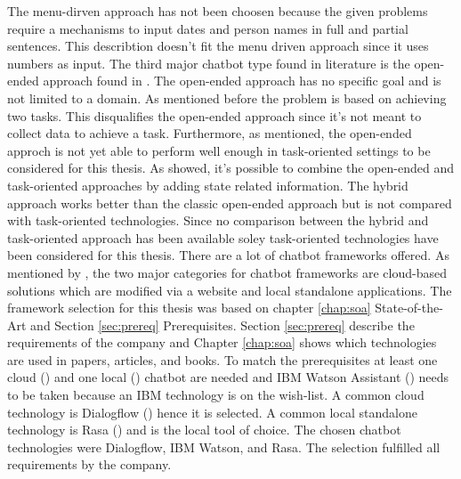 The menu-dirven approach has not been choosen because the given problems 
require a mechanisms to input dates and person names in full and partial sentences.
This describtion doesn't fit the menu driven approach since it uses numbers as input.
The third major chatbot type found in literature is the open-ended approach found in 
\citet{williams2017hybrid, bordes2016learning, rahman2017programming}.
The open-ended approach has no specific goal and is not limited to a domain.
As mentioned before the problem is based on achieving two tasks.
This disqualifies the open-ended approach since it's not meant to
collect data to achieve a task.
Furthermore, as \citet{bordes2016learning} mentioned, the open-ended approch is not 
yet able to perform well enough in task-oriented settings to be considered for this 
thesis.
As \citet{williams2017hybrid} showed, it's possible to combine the open-ended and 
task-oriented approaches by adding state related information.
The hybrid approach works better than the classic open-ended approach but 
is not compared with task-oriented technologies.
Since no comparison between the hybrid and task-oriented approach has been available 
soley task-oriented technologies have been considered for this thesis.
There are a lot of chatbot frameworks offered.
As mentioned by \citet{kane2016role}, the two major categories for chatbot frameworks 
are cloud-based solutions which are modified via a website and local standalone applications.
The framework selection for this thesis was based on chapter \ref{chap:soa} State-of-the-Art 
and Section \ref{sec:prereq} Prerequisites.
Section \ref{sec:prereq} describe the requirements of the company and Chapter \ref{chap:soa} shows which technologies are 
used in papers, articles, and books.
To match the prerequisites at least one cloud (\citet{braunEvaluatingNLU, rahman2017programming}) and one local (\citet{braunEvaluatingNLU}) chatbot are needed and IBM Watson Assistant (\citet{rahman2017programming, pharmacybot, ieee2018watson, gregori2017evaluation}) needs to be taken because an IBM technology is on the wish-list.
A common cloud technology is Dialogflow (\citet{braunEvaluatingNLU, dutta2017developing, singhbuilding, buiildChatbotsPython, rahman2017programming, ieee2018watson}) hence it is selected.
A common local standalone technology is Rasa (\citet{braunEvaluatingNLU, singhbuilding, rasabocklisch2017, buiildChatbotsPython, gregori2017evaluation}) and is the local tool of choice.
The chosen chatbot technologies were Dialogflow, IBM Watson, and Rasa.
The selection fulfilled all requirements by the company.
